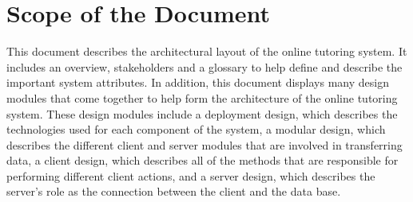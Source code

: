 \chapter{Scope of the Document}
This document describes the architectural layout of the online tutoring system. It includes an overview, stakeholders and a glossary to help define and describe the important system attributes. In addition, this document displays many design modules that come together to help form the architecture of the online tutoring system.  These design modules include a deployment design, which describes the technologies used for each component of the system, a  modular design, which describes the different client and server modules that are involved in transferring data, a client design, which describes all of the methods that are responsible for performing different client actions, and a server design, which describes the server’s role as the connection between the client and the data base.     


